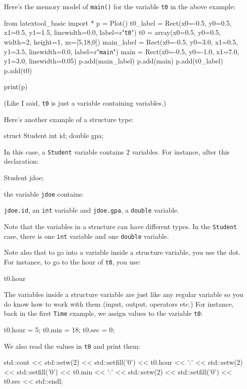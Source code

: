Here's the memory model of \verb!main()! for the variable \verb!t0! in the
above example:
\begin{python}
from latextool_basic import *
p = Plot()
t0_label = Rect(x0=-0.5, y0=0.5, x1=0.5, y1=1.5, linewidth=0.0, label=r"\texttt{t0}")
t0 = array(x0=0.5, y0=0.5, width=2, height=1, xs=[5,18,0])
main_label = Rect(x0=-0.5, y0=3.0, x1=0.5, y1=3.5, linewidth=0.0, label=r"\texttt{main}")
main = Rect(x0=-0.5, y0=-1.0, x1=7.0, y1=3.0, linewidth=0.05)
p.add(main_label)
p.add(main)
p.add(t0_label)
p.add(t0)

print(p)
\end{python}

(Like I said, \verb!t0! is just a variable containing variables.)

Here's another example of a structure type:
\begin{console}
struct Student
{
    int id;
    double gpa;
}
\end{console}

In this case, a \verb!Student! variable contains $2$ variables. For instance,
after this declaration:
\begin{console}
Student jdoe;
\end{console}
the variable \verb!jdoe! contains:
\begin{tightlist}
  \li \verb!jdoe.id!, an \verb!int! variable and
  \li \verb!jdoe.gpa!, a \verb!double! variable.
\end{tightlist}

Note that the variables in a structure can have different types. In the
\verb!Student! case, there is one \verb!int! variable and one \verb!double!
variable.

Note also that to go into a variable inside a structure variable, you use the
dot. For instance, to go to the hour of \verb!t0!, you use:
\begin{console}
t0.hour
\end{console}

The variables inside a structure variable are just like any regular variable so
you do know how to work with them (input, output, operators etc.) For instance,
back in the first \verb!Time! example, we assign values to the variable
\verb!t0!:
\begin{console}
t0.hour = 5;
t0.min = 18;
t0.sec = 0;
\end{console}

We also read the values in \verb!t0! and print them:
\begin{console}
std::cout << std::setw(2) << std::setfill('0') << t0.hour
          << ':'
          << std::setw(2) << std::setfill('0') << t0.min
          << ':'
          << std::setw(2) << std::setfill('0') << t0.sec
          << std::endl;
\end{console}

